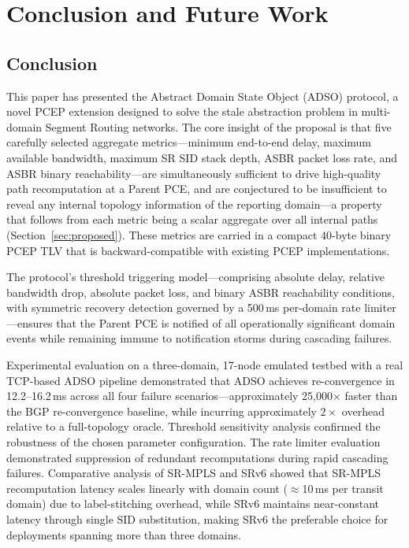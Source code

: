 \documentclass[conference]{IEEEtran}
\begin{document}
\section{Conclusion and Future Work}
\label{sec:conclusion}

\subsection{Conclusion}

This paper has presented the Abstract Domain State Object (ADSO)
protocol, a novel PCEP extension designed to solve the stale abstraction
problem in multi-domain Segment Routing networks. The core insight of
the proposal is that five carefully selected aggregate metrics---minimum
end-to-end delay, maximum available bandwidth, maximum SR SID stack
depth, ASBR packet loss rate, and ASBR binary reachability---are
simultaneously sufficient to drive high-quality path recomputation at a
Parent PCE, and are conjectured to be insufficient to reveal any
internal topology information of the reporting domain---a property that
follows from each metric being a scalar aggregate over all internal
paths (Section~\ref{sec:proposed}). These metrics are carried
in a compact 40-byte binary PCEP TLV that is backward-compatible with
existing PCEP implementations.

The protocol's threshold triggering model---comprising absolute delay,
relative bandwidth drop, absolute packet loss, and binary ASBR
reachability conditions, with symmetric recovery detection governed by
a 500\,ms per-domain rate limiter---ensures that the Parent PCE is
notified of all operationally significant domain events while remaining
immune to notification storms during cascading failures.

Experimental evaluation on a three-domain, 17-node emulated testbed
with a real TCP-based ADSO pipeline demonstrated that ADSO achieves
re-convergence in 12.2--16.2\,ms across all four failure
scenarios---approximately 25{,}000$\times$ faster than the BGP
re-convergence baseline, while incurring approximately $2\times$
overhead relative to a full-topology oracle. Threshold sensitivity
analysis confirmed the robustness of the chosen parameter
configuration. The rate limiter evaluation demonstrated suppression of
redundant recomputations during rapid cascading failures. Comparative
analysis of SR-MPLS and SRv6 showed that SR-MPLS recomputation latency
scales linearly with domain count ($\approx$10\,ms per transit domain)
due to label-stitching overhead, while SRv6 maintains near-constant
latency through single SID substitution, making SRv6 the preferable
choice for deployments spanning more than three domains.
\end{document}

